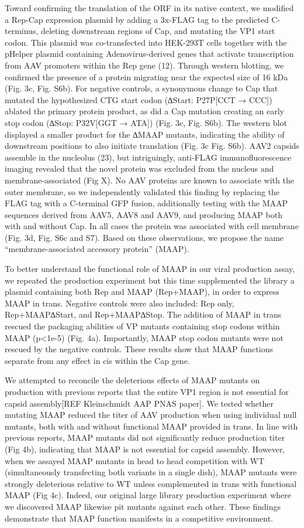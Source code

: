 Toward confirming the translation of the ORF in its native context, we modified a Rep-Cap expression plasmid by adding a 3x-FLAG tag to the predicted C-terminus, deleting downstream regions of Cap, and mutating the VP1 start codon. This plasmid was co-transfected into HEK-293T cells together with the pHelper plasmid containing Adenovirus-derived genes that activate transcription from AAV promoters within the Rep gene (12). Through western blotting, we confirmed the presence of a protein migrating near the expected size of 16 kDa (Fig. 3c, Fig. S6b). For negative controls, a synonymous change to Cap that mutated the hypothesized CTG start codon (∆Start: P27P[CCT → CCC]) ablated the primary protein product, as did a Cap mutation creating an early stop codon (∆Stop: P32V[GGT → ATA]) (Fig. 3c, Fig. S6b). The western blot displayed a smaller product for the ∆MAAP mutants, indicating the ability of downstream positions to also initiate translation (Fig. 3c Fig. S6b). AAV2 capsids assemble in the nucleolus (23), but intriguingly, anti-FLAG immunofluorescence imaging revealed that the novel protein was excluded from the nucleus and membrane-associated (Fig X). No AAV proteins are known to associate with the outer membrane, so we independently validated this finding by replacing the FLAG tag with a C-terminal GFP fusion, additionally testing with the MAAP sequences derived from AAV5, AAV8 and AAV9, and producing MAAP both with and without Cap. In all cases the protein was associated with cell membrane (Fig. 3d, Fig. S6c and S7). Based on these observations, we propose the name “membrane-associated accessory protein” (MAAP).

To better understand the functional role of MAAP in our viral production assay, we repeated the production experiment but this time supplemented the library a plasmid containing both Rep and MAAP (Rep+MAAP), in order to express MAAP in trans. Negative controls were also included: Rep only, Rep+MAAP∆Start, and Rep+MAAP∆Stop. The addition of MAAP in trans rescued the packaging abilities of VP mutants containing stop codons within MAAP (p<1e-5) (Fig. 4a). Importantly, MAAP stop codon mutants were not rescued by the negative controls. These results show that MAAP functions separate from any effect in cis within the Cap gene.

We attempted to reconcile the deleterious effects of MAAP mutants on production with previous reports that the entire VP1 region is not essential for capsid assembly[REF Kleinschmidt AAP PNAS paper]. We tested whether mutating MAAP reduced the titer of AAV production when using individual null mutants, both with and without functional MAAP provided in trans. In line with previous reports, MAAP mutants did not significantly reduce production titer (Fig 4b), indicating that MAAP is not essential for capsid assembly. However, when we assayed MAAP mutants in head to head competition with WT (simultaneously transfecting both variants in a single dish), MAAP mutants were strongly deleterious relative to WT unless complemented in trans with functional MAAP (Fig 4c). Indeed, our original large library production experiment where we discovered MAAP likewise pit mutants against each other. These findings demonstrate that MAAP function manifests in a competitive environment. 

